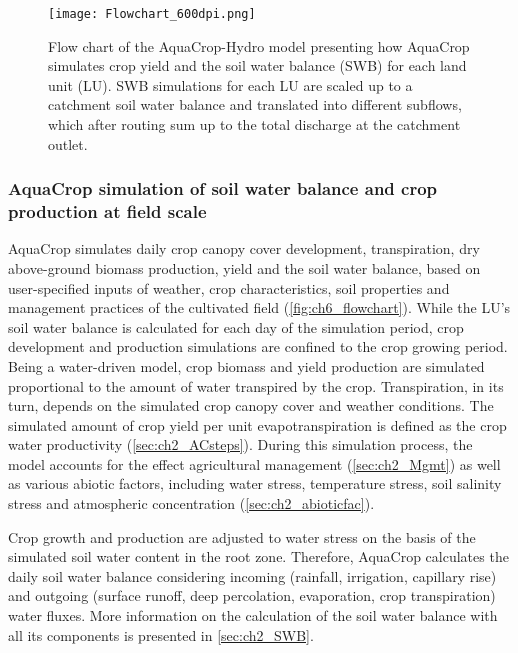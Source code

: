 \clearpage
\begin{figure}[!h]
\centering
\texttt{[image: Flowchart\_600dpi.png]}
\caption{Flow chart of the AquaCrop-Hydro model presenting how AquaCrop simulates crop yield and the soil water balance (SWB) for each land unit (LU). SWB simulations for each LU are scaled up to a catchment soil water balance and translated into different subflows, which after routing sum up to the total discharge at the catchment outlet.\label{fig:ch6_flowchart}}	
\end{figure}

\subsubsection{AquaCrop simulation of soil water balance and crop production at field scale}\label{sec:ch6_AC} 
AquaCrop simulates daily crop canopy cover development, transpiration, dry above-ground biomass production, yield and the soil water balance, based on user-specified inputs of weather, crop characteristics, soil properties and management practices of the cultivated field (\autoref{fig:ch6_flowchart}). While the LU's soil water balance is calculated for each day of the simulation period, crop development and production simulations are confined to the crop growing period. Being a water-driven model, crop biomass and yield production are simulated proportional to the amount of water transpired by the crop. Transpiration, in its turn, depends on the simulated crop canopy cover and weather conditions. The simulated amount of crop yield per unit evapotranspiration is defined as the crop water productivity (\autoref{sec:ch2_ACsteps}). During this  simulation process, the model accounts for the effect agricultural management (\autoref{sec:ch2_Mgmt}) as well as various abiotic factors, including water stress, temperature stress, soil salinity stress and atmospheric \COtwo concentration (\autoref{sec:ch2_abioticfac}). 

Crop growth and production are adjusted to water stress on the basis of the simulated soil water content in the root zone. Therefore, AquaCrop calculates the daily soil water balance considering incoming (rainfall, irrigation, capillary rise) and outgoing (surface runoff, deep percolation, evaporation, crop transpiration) water fluxes. More information on the calculation of the soil water balance with all its components is presented in \autoref{sec:ch2_SWB}.

